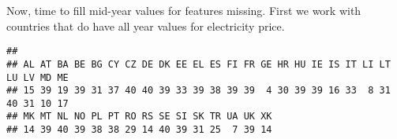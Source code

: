 \documentclass[
]{article}
\newenvironment{Shaded}{\begin{snugshade}}{\end{snugshade}}
\newcommand{\DecValTok}[1]{\textcolor[rgb]{0.00,0.00,0.81}{#1}}
\newcommand{\KeywordTok}[1]{\textcolor[rgb]{0.13,0.29,0.53}{\textbf{#1}}}
\newcommand{\NormalTok}[1]{#1}
\newcommand{\OperatorTok}[1]{\textcolor[rgb]{0.81,0.36,0.00}{\textbf{#1}}}
\newcommand{\StringTok}[1]{\textcolor[rgb]{0.31,0.60,0.02}{#1}}
\begin{document}
\begin{Shaded}
\end{Shaded}

Now, time to fill mid-year values for features missing. First we work
with countries that do have all year values for electricity price.

\begin{Shaded}
\end{Shaded}

\begin{verbatim}
## 
## AL AT BA BE BG CY CZ DE DK EE EL ES FI FR GE HR HU IE IS IT LI LT LU LV MD ME 
## 15 39 19 39 31 37 40 40 39 33 39 38 39 39  4 30 39 39 16 33  8 31 40 31 10 17 
## MK MT NL NO PL PT RO RS SE SI SK TR UA UK XK 
## 14 39 40 39 38 38 29 14 40 39 31 25  7 39 14
\end{verbatim}
\end{document}
